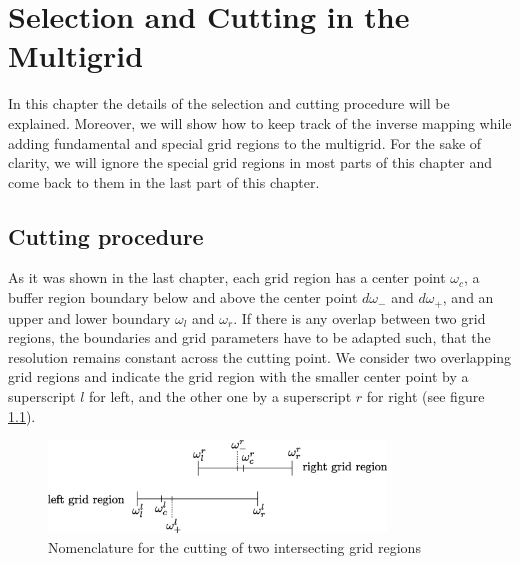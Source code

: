 \chapter{Selection and Cutting in the Multigrid} \label{chapter:multigrid_selection_and_cutting}
In this chapter the details of the selection and cutting procedure will be explained. Moreover, we will show how to keep track of the inverse mapping while adding fundamental and special grid regions to the multigrid. For the sake of clarity, we will ignore the special grid regions in most parts of this chapter and come back to them in the last part of this chapter.
\section{Cutting procedure}\label{sec:cutting_procedure}
As it was shown in the last chapter, each grid region has a center point $\omega_c$, a buffer region boundary below and above the center point $d\omega_-$ and $d\omega_+$, and an upper and lower boundary $\omega_l$ and $\omega_r$. If there is any overlap between two grid regions, the boundaries and grid parameters have to be adapted such, that the resolution remains constant across the cutting point. We consider two overlapping grid regions and indicate the grid region with the smaller center point by a superscript $l$ for left, and the other one by a superscript $r$ for right (see figure \ref{fig:cutting_gr}).

\begin{figure}[h]
	\centering
	\includegraphics[width=0.8\textwidth]{pics/cutting_gr.eps}
	\caption{Nomenclature for the cutting of two intersecting grid regions}
	\label{fig:cutting_gr}
\end{figure}

